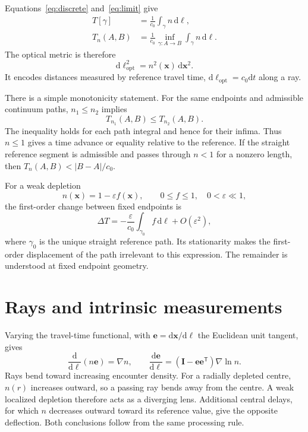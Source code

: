\documentclass[aps,prd,reprint,nofootinbib]{revtex4-2}
\newcommand{\dd}{\mathrm{d}}
\newcommand{\ve}{\varepsilon}
\begin{document}
Equations~\eqref{eq:discrete} and~\eqref{eq:limit} give
\begin{equation}
 \begin{aligned}
 T[\gamma]&=\frac{1}{c_0}\int_\gamma n\,\dd\ell,\\
 T_n(A,B)&=\frac{1}{c_0}\inf_{\gamma:A\to B}
                  \int_\gamma n\,\dd\ell.
 \end{aligned}
 \label{eq:fermat}
\end{equation}
The optical metric is therefore
\begin{equation}
 \dd\ell_{\mathrm{opt}}^2
       =n^2(\mathbf x)\,\dd\mathbf x^2.
 \label{eq:optical}
\end{equation}
It encodes distances measured by reference travel time,
$\dd\ell_{\mathrm{opt}}=c_0\dd t$ along a ray.

There is a simple monotonicity statement. For the same endpoints and
admissible continuum paths, $n_1\leq n_2$ implies
\begin{equation}
 T_{n_1}(A,B)\leq T_{n_2}(A,B).
 \label{eq:monotonic}
\end{equation}
The inequality holds for each path integral and hence for their
infima. Thus $n\leq1$ gives a time advance or equality relative to the
reference. If the straight reference segment is admissible and passes
through $n<1$ for a nonzero length, then
$T_n(A,B)<|B-A|/c_0$.

For a weak depletion
\begin{equation}
 n(\mathbf x)=1-\ve f(\mathbf x),
 \qquad 0\leq f\leq1,\quad 0<\ve\ll1,
 \label{eq:profile}
\end{equation}
the first-order change between fixed endpoints is
\begin{equation}
 \Delta T=-\frac{\ve}{c_0}
       \int_{\gamma_0}f\,\dd\ell+O(\ve^2),
 \label{eq:timefirst}
\end{equation}
where $\gamma_0$ is the unique straight reference path. Its stationarity
makes the first-order displacement of the path irrelevant to this
expression. The remainder is understood at fixed endpoint geometry.

\section{Rays and intrinsic measurements}
\label{sec:rays}

Varying the travel-time functional, with $\mathbf e=\dd\mathbf x/\dd\ell$
the Euclidean unit tangent, gives
\begin{equation}
 \frac{\dd}{\dd\ell}(n\mathbf e)=\nabla n,
 \qquad
 \frac{\dd\mathbf e}{\dd\ell}
   =(\mathbf I-\mathbf e\mathbf e^{\mathsf T})\nabla\ln n.
 \label{eq:ray}
\end{equation}
Rays bend toward increasing encounter density. For a radially depleted
centre, $n(r)$ increases outward, so a passing ray bends away from the
centre. A weak localized depletion therefore acts as a diverging lens.
Additional central delays, for which $n$ decreases outward toward its
reference value, give the opposite deflection. Both conclusions follow
from the same processing rule.
\end{document}
